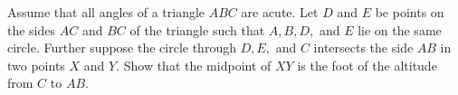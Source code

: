 Assume that all angles of a triangle $ABC$ are acute. Let $D$ and $E$ be points on the sides $AC$ and $BC$ of the triangle such that $A, B, D,$ and $E$ lie on the same circle. Further suppose the circle through $D,E,$ and $C$ intersects the side $AB$ in two points $X$ and $Y$. Show that the midpoint of $XY$ is the foot of the altitude from $C$ to $AB$.